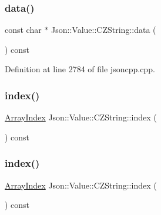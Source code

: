 \hypertarget{class_json_1_1_value_1_1_c_z_string_af6eee54f8dc43a1203d5af6ba0a5c9a2}{}\label{class_json_1_1_value_1_1_c_z_string_af6eee54f8dc43a1203d5af6ba0a5c9a2} 
\subsubsection{\texorpdfstring{data()}{data()}\hspace{0.1cm}{\footnotesize\ttfamily [2/2]}}
{\footnotesize\ttfamily const char $\ast$ Json\+::\+Value\+::\+C\+Z\+String\+::data (\begin{DoxyParamCaption}{ }\end{DoxyParamCaption}) const}



Definition at line 2784 of file jsoncpp.\+cpp.

\hypertarget{class_json_1_1_value_1_1_c_z_string_a0f3ba09401525d4f01dafd577122ee32}{}\label{class_json_1_1_value_1_1_c_z_string_a0f3ba09401525d4f01dafd577122ee32} 
\subsubsection{\texorpdfstring{index()}{index()}\hspace{0.1cm}{\footnotesize\ttfamily [1/2]}}
{\footnotesize\ttfamily \hyperlink{class_json_1_1_value_a184a91566cccca7b819240f0d5561c7d}{Array\+Index} Json\+::\+Value\+::\+C\+Z\+String\+::index (\begin{DoxyParamCaption}{ }\end{DoxyParamCaption}) const}

\hypertarget{class_json_1_1_value_1_1_c_z_string_a0f3ba09401525d4f01dafd577122ee32}{}\label{class_json_1_1_value_1_1_c_z_string_a0f3ba09401525d4f01dafd577122ee32} 
\subsubsection{\texorpdfstring{index()}{index()}\hspace{0.1cm}{\footnotesize\ttfamily [2/2]}}
{\footnotesize\ttfamily \hyperlink{class_json_1_1_value_a184a91566cccca7b819240f0d5561c7d}{Array\+Index} Json\+::\+Value\+::\+C\+Z\+String\+::index (\begin{DoxyParamCaption}{ }\end{DoxyParamCaption}) const}



